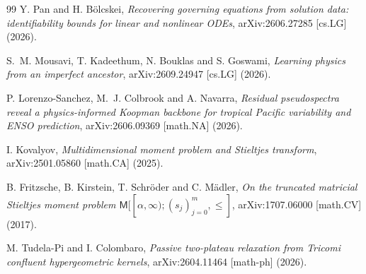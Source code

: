 \documentclass[11pt]{article}
\theoremstyle{remark}
\begin{document}
\begin{thebibliography}{99}
Y. Pan and H. B\"{o}lcskei, \emph{Recovering governing equations from solution data: identifiability
bounds for linear and nonlinear ODEs}, arXiv:2606.27285 [cs.LG] (2026).

S.~M. Mousavi, T. Kadeethum, N. Bouklas and S. Goswami, \emph{Learning physics from an imperfect
ancestor}, arXiv:2609.24947 [cs.LG] (2026).

P. Lorenzo-Sanchez, M.~J. Colbrook and A. Navarra, \emph{Residual pseudospectra reveal a
physics-informed Koopman backbone for tropical Pacific variability and ENSO prediction},
arXiv:2606.09369 [math.NA] (2026).

I. Kovalyov, \emph{Multidimensional moment problem and Stieltjes transform}, arXiv:2501.05860
[math.CA] (2025).

B. Fritzsche, B. Kirstein, T. Schr\"{o}der and C. M\"{a}dler, \emph{On the truncated matricial
Stieltjes moment problem $\mathsf{M}[[\alpha,\infty);(s_j)_{j=0}^m,\leq]$}, arXiv:1707.06000
[math.CV] (2017).

M. Tudela-Pi and I. Colombaro, \emph{Passive two-plateau relaxation from Tricomi confluent
hypergeometric kernels}, arXiv:2604.11464 [math-ph] (2026).

\end{thebibliography}
\end{document}
